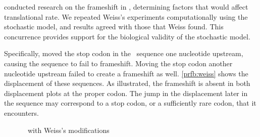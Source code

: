 \documentclass[12pt, draft]{article}
\numberwithin{equation}{section}
\begin{document}
\citet{weiss87,weiss88} conducted research on the
frameshift in \prfB, determining factors that would affect
translational rate.  We repeated Weiss's experiments computationally
using the stochastic model, and results agreed with those that Weiss found.
This concurrence provides support for the biological validity of
the stochastic model.

Specifically, \citeauthor{weiss87} moved the stop codon in the
\prfB\ sequence one nucleotide upstream, causing the sequence to fail to
frameshift. Moving the stop codon another nucleotide upstream failed
to create a frameshift as well. \autoref{prfb:weiss}
shows the displacement of these sequences.  As illustrated,
the frameshift is absent in both displacement plots at the proper codon.
The jump in the displacement later in the sequence may correspond to a
stop codon, or a sufficiently rare codon, that it encounters.

\begin{figure}
    \centering
    \caption{\prfB\ with Weiss's modifications}
    \label{prfb:weiss}
\end{figure}
\end{document}
